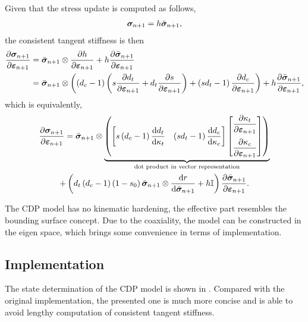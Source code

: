 Given that the stress update is computed as follows,
\begin{gather}
\bm{\sigma}_{n+1}=h\bar{\bm{\sigma}}_{n+1},
\end{gather}
the consistent tangent stiffness is then
\begin{gather}
\begin{split}
\dfrac{\partial{\bm{\sigma}_{n+1}}}{\partial{\bm{\varepsilon}_{n+1}}}&=\bar{\bm{\sigma}}_{n+1}\otimes\dfrac{\partial{h}}{\partial{\bm{\varepsilon}_{n+1}}}+h\dfrac{\partial{\bar{\bm{\sigma}}_{n+1}}}{\partial{\bm{\varepsilon}_{n+1}}}\\
&=\bar{\bm{\sigma}}_{n+1}\otimes\left(\left(d_c-1\right)\left(s\dfrac{\partial{d_t}}{\partial{\bm{\varepsilon}_{n+1}}}+d_t\dfrac{\partial{s}}{\partial{\bm{\varepsilon}_{n+1}}}\right)+\left(sd_t-1\right)\dfrac{\partial{d_c}}{\partial{\bm{\varepsilon}_{n+1}}}\right)+h\dfrac{\partial{\bar{\bm{\sigma}}_{n+1}}}{\partial{\bm{\varepsilon}_{n+1}}},
\end{split}
\end{gather}
which is equivalently,
\begin{multline}\label{eq:cdp_pd}
\dfrac{\partial{\bm{\sigma}_{n+1}}}{\partial{\bm{\varepsilon}_{n+1}}}=\bar{\bm{\sigma}}_{n+1}\otimes\underbrace{\left(\begin{bmatrix}
s\left(d_c-1\right)\dfrac{\mathrm{d}d_t}{\mathrm{d}\kappa_t}&
\left(sd_t-1\right)\dfrac{\mathrm{d}d_c}{\mathrm{d}\kappa_c}
\end{bmatrix}
\begin{bmatrix}
\dfrac{\partial{\kappa_t}}{\partial{\bm{\varepsilon}_{n+1}}}\\[4mm]
\dfrac{\partial{\kappa_c}}{\partial{\bm{\varepsilon}_{n+1}}}
\end{bmatrix}\right)}_\text{dot product in vector representation}\\+\left(d_t\left(d_c-1\right)\left(1-s_0\right)\bar{\bm{\sigma}}_{n+1}\otimes\dfrac{\mathrm{d}r}{\mathrm{d}\bar{\bm{\sigma}}_{n+1}}+h\mathbb{I}\right)\dfrac{\partial{\bar{\bm{\sigma}}_{n+1}}}{\partial{\bm{\varepsilon}_{n+1}}}.
\end{multline}

The CDP model has no kinematic hardening, the effective part resembles the bounding surface concept. Due to the coaxiality, the model can be constructed in the eigen space, which brings some convenience in terms of implementation.
\subsection{Implementation}
The state determination of the CDP model is shown in . Compared with the original implementation, the presented one is much more concise and is able to avoid lengthy computation of consistent tangent stiffness.


